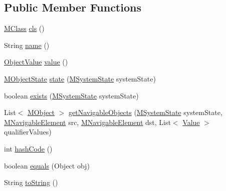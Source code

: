 \subsection*{Public Member Functions}
\begin{DoxyCompactItemize}
\item 
\hyperlink{interfaceorg_1_1tzi_1_1use_1_1uml_1_1mm_1_1_m_class}{M\-Class} \hyperlink{interfaceorg_1_1tzi_1_1use_1_1uml_1_1sys_1_1_m_object_ad9c1f8e04d1393994906d31e04db2905}{cls} ()
\item 
String \hyperlink{interfaceorg_1_1tzi_1_1use_1_1uml_1_1sys_1_1_m_object_ae6a33f03314482e804884e18b261a68f}{name} ()
\item 
\hyperlink{classorg_1_1tzi_1_1use_1_1uml_1_1ocl_1_1value_1_1_object_value}{Object\-Value} \hyperlink{interfaceorg_1_1tzi_1_1use_1_1uml_1_1sys_1_1_m_object_a13e3ef3f27756ab207e8975ab4720ddb}{value} ()
\item 
\hyperlink{classorg_1_1tzi_1_1use_1_1uml_1_1sys_1_1_m_object_state}{M\-Object\-State} \hyperlink{interfaceorg_1_1tzi_1_1use_1_1uml_1_1sys_1_1_m_object_a9e190bf51109b05459037df25414d50c}{state} (\hyperlink{classorg_1_1tzi_1_1use_1_1uml_1_1sys_1_1_m_system_state}{M\-System\-State} system\-State)
\item 
boolean \hyperlink{interfaceorg_1_1tzi_1_1use_1_1uml_1_1sys_1_1_m_object_a6edb37088e2008c2f570e8ac821d73eb}{exists} (\hyperlink{classorg_1_1tzi_1_1use_1_1uml_1_1sys_1_1_m_system_state}{M\-System\-State} system\-State)
\item 
List$<$ \hyperlink{interfaceorg_1_1tzi_1_1use_1_1uml_1_1sys_1_1_m_object}{M\-Object} $>$ \hyperlink{interfaceorg_1_1tzi_1_1use_1_1uml_1_1sys_1_1_m_object_aa83350a5e2ee9457ce9c5b07fa58b21d}{get\-Navigable\-Objects} (\hyperlink{classorg_1_1tzi_1_1use_1_1uml_1_1sys_1_1_m_system_state}{M\-System\-State} system\-State, \hyperlink{interfaceorg_1_1tzi_1_1use_1_1uml_1_1mm_1_1_m_navigable_element}{M\-Navigable\-Element} src, \hyperlink{interfaceorg_1_1tzi_1_1use_1_1uml_1_1mm_1_1_m_navigable_element}{M\-Navigable\-Element} dst, List$<$ \hyperlink{classorg_1_1tzi_1_1use_1_1uml_1_1ocl_1_1value_1_1_value}{Value} $>$ qualifier\-Values)
\item 
int \hyperlink{interfaceorg_1_1tzi_1_1use_1_1uml_1_1sys_1_1_m_object_ad41004dbae47a4591cfb281af9fec01b}{hash\-Code} ()
\item 
boolean \hyperlink{interfaceorg_1_1tzi_1_1use_1_1uml_1_1sys_1_1_m_object_a51e29ad48defa4d50aa8b4e3eb0de260}{equals} (Object obj)
\item 
String \hyperlink{interfaceorg_1_1tzi_1_1use_1_1uml_1_1sys_1_1_m_object_a6e3f1f5438c02cd31ed9cec62d7d22e6}{to\-String} ()
\end{DoxyCompactItemize}


